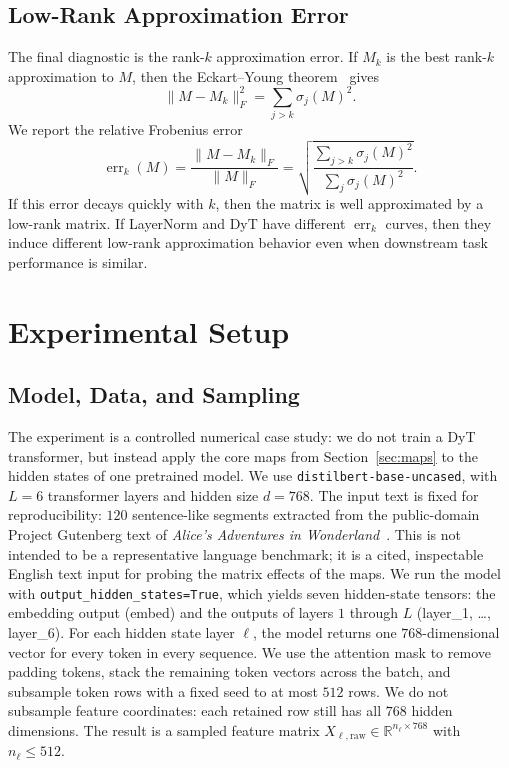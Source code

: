 \documentclass[11pt]{article}
\newcommand{\R}{\mathbb{R}}
\begin{document}
\subsection{Low-Rank Approximation Error}

The final diagnostic is the rank-$k$ approximation error. If \(M_k\) is the best rank-\(k\) approximation to \(M\), then the Eckart--Young theorem~\cite{eckart1936approximation} gives
\[
    \|M-M_k\|_F^2
    =
    \sum_{j>k}\sigma_j(M)^2.
\]
We report the relative Frobenius error
\begin{equation}
    \operatorname{err}_k(M)
    =
    \frac{\|M-M_k\|_F}{\|M\|_F}
    =
    \sqrt{
        \frac{\sum_{j>k}\sigma_j(M)^2}
             {\sum_j \sigma_j(M)^2}
    }.
\label{eq:low-rank-error}
\end{equation}
If this error decays quickly with \(k\), then the matrix is well approximated by a low-rank matrix. If LayerNorm and DyT have different $\operatorname{err}_k$ curves, then they induce different low-rank approximation behavior even when downstream task performance is similar.

\section{Experimental Setup}
\label{sec:experiments}

\subsection{Model, Data, and Sampling}

The experiment is a controlled numerical case study: we do not train a DyT transformer, but instead apply the core maps from Section~\ref{sec:maps} to the hidden states of one pretrained model. We use \texttt{distilbert-base-uncased}, with $L=6$ transformer layers and hidden size $d=768$. The input text is fixed for reproducibility: $120$ sentence-like segments extracted from the public-domain Project Gutenberg text of \emph{Alice's Adventures in Wonderland}~\cite{carroll1865alice}. This is not intended to be a representative language benchmark; it is a cited, inspectable English text input for probing the matrix effects of the maps. We run the model with \texttt{output\_hidden\_states=True}, which yields seven hidden-state tensors: the embedding output (\textsf{embed}) and the outputs of layers $1$ through $L$ (\textsf{layer\_1}, \dots, \textsf{layer\_6}). For each hidden state layer $\ell$, the model returns one $768$-dimensional vector for every token in every sequence. We use the attention mask to remove padding tokens, stack the remaining token vectors across the batch, and subsample token rows with a fixed seed to at most $512$ rows. We do not subsample feature coordinates: each retained row still has all $768$ hidden dimensions. The result is a sampled feature matrix $X_{\ell,\mathrm{raw}}\in\R^{n_\ell\times 768}$ with $n_\ell\le 512$.
\end{document}
